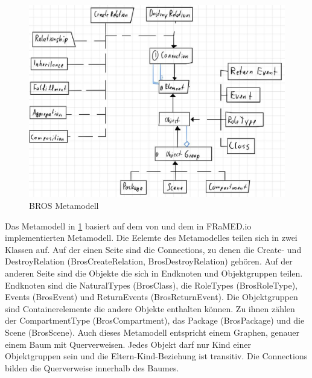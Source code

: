 \begin{figure}
    \centering
    \includegraphics[width=\textwidth,keepaspectratio]{../images/brosMetamodell.jpg}%
    \caption{BROS Metamodell}%
    \label{fig:brosMetamodell}
\end{figure}

Das Metamodell in \cref{fig:brosMetamodell} basiert auf dem von \cite{Schoen} und dem in FRaMED.io implementierten Metamodell.
Die Eelemte des Metamodelles teilen sich in zwei Klassen auf.
Auf der einen Seite sind die Connections, zu denen die Create- und DestroyRelation (BrosCreateRelation, BrosDestroyRelation) gehören.
Auf der anderen Seite sind die Objekte die sich in Endknoten und Objektgruppen teilen.
Endknoten sind die NaturalTypes (BrosClass), die RoleTypes (BrosRoleType), Events (BrosEvent) und ReturnEvents (BrosReturnEvent).
Die Objektgruppen sind Containerelemente die andere Objekte enthalten können.
Zu ihnen zählen der CompartmentType (BrosCompartment), das Package (BrosPackage) und die Scene (BrosScene).
Auch dieses Metamodell entspricht einem Graphen, genauer einem Baum mit Querverweisen.
Jedes Objekt darf nur Kind einer Objektgruppen sein und die Eltern-Kind-Beziehung ist transitiv.
Die Connections bilden die Querverweise innerhalb des Baumes.
